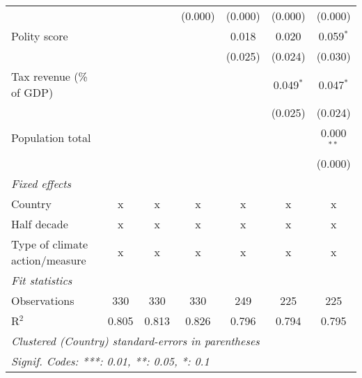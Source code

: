 \begin{tabular}{lcccccc}
                                                                                                 &         &               & (0.000)        & (0.000)        & (0.000)        & (0.000)\\   
   Polity score                                                                                  &         &               &                & 0.018          & 0.020          & 0.059$^{*}$\\   
                                                                                                 &         &               &                & (0.025)        & (0.024)        & (0.030)\\   
   Tax revenue (\% of GDP)                                                                       &         &               &                &                & 0.049$^{*}$    & 0.047$^{*}$\\   
                                                                                                 &         &               &                &                & (0.025)        & (0.024)\\   
   Population total                                                                              &         &               &                &                &                & 0.000$^{**}$\\   
                                                                                                 &         &               &                &                &                & (0.000)\\   
   \emph{Fixed effects}\\
   Country                                                                                       & x       & x             & x              & x              & x              & x\\  
   Half decade                                                                                   & x       & x             & x              & x              & x              & x\\  
   Type of climate action/measure                                                                & x       & x             & x              & x              & x              & x\\  
   \midrule \emph{Fit statistics}\\
   Observations                                                                                  & 330     & 330           & 330            & 249            & 225            & 225\\  
   R$^2$                                                                                         & 0.805   & 0.813         & 0.826          & 0.796          & 0.794          & 0.795\\  
   \midrule
   \multicolumn{7}{l}{\emph{Clustered (Country) standard-errors in parentheses}}\\
   \multicolumn{7}{l}{\emph{Signif. Codes: ***: 0.01, **: 0.05, *: 0.1}}\\
\end{tabular}
\par\endgroup


